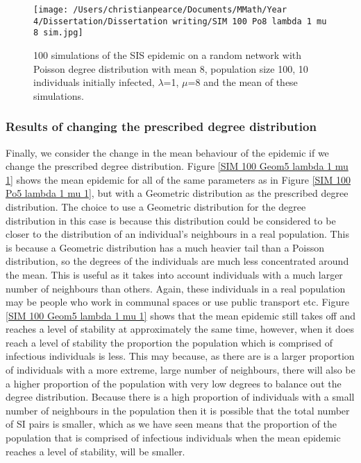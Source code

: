 \documentclass{uonmathsreport}
\begin{document}
\begin{figure}
\begin{center}
\texttt{[image: /Users/christianpearce/Documents/MMath/Year 4/Dissertation/Dissertation writing/SIM 100 Po8 lambda 1 mu 8 sim.jpg]}
\end{center}
\caption{100 simulations of the SIS epidemic on a random network with Poisson degree distribution with mean 8, population size 100, 10 individuals initially infected, $\lambda$=1, $\mu$=8 and the mean of these simulations.}
\label{SIM 100 Po8 lambda 1 mu 8 sim}
\end{figure}

\subsubsection{Results of changing the prescribed degree distribution} \label{subsub:5.5.6}

Finally, we consider the change in the mean behaviour of the epidemic if we change the prescribed degree distribution. Figure \ref{SIM 100 Geom5 lambda 1 mu 1} shows the mean epidemic for all of the same parameters as in Figure \ref{SIM 100 Po5 lambda 1 mu 1}, but with a Geometric distribution as the prescribed degree distribution. The choice to use a Geometric distribution for the degree distribution in this case is because this distribution could be considered to be closer to the distribution of an individual’s neighbours in a real population. This is because a Geometric distribution has a much heavier tail than a Poisson distribution, so the degrees of the individuals are much less concentrated around the mean. This is useful as it takes into account individuals with a much larger number of neighbours than others. Again, these individuals in a real population may be people who work in communal spaces or use public transport etc. Figure \ref{SIM 100 Geom5 lambda 1 mu 1} shows that the mean epidemic still takes off and reaches a level of stability at approximately the same time, however, when it does reach a level of stability the proportion the population which is comprised of infectious individuals is less. This may because, as there are is a larger proportion of individuals with a more extreme, large number of neighbours, there will also be a higher proportion of the population with very low degrees to balance out the degree distribution. Because there is a high proportion of individuals with a small number of neighbours in the population then it is possible that the total number of SI pairs is smaller, which as we have seen means that the proportion of the population that is comprised of infectious individuals when the mean epidemic reaches a level of stability, will be smaller.
\end{document}
